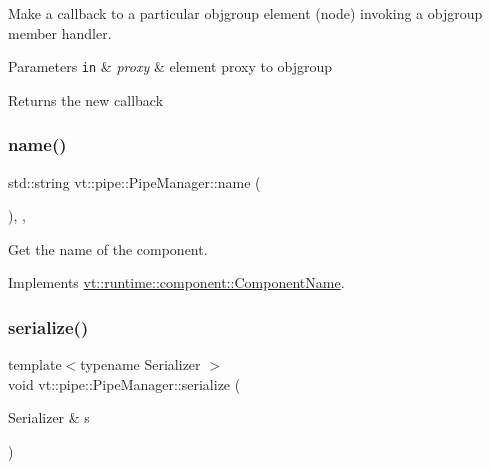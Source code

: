 Make a callback to a particular objgroup element (node) invoking a objgroup member handler. 


\begin{DoxyParams}[1]{Parameters}
\mbox{\tt in}  & {\em proxy} & element proxy to objgroup\\
\hline
\end{DoxyParams}
\begin{DoxyReturn}{Returns}
the new callback 
\end{DoxyReturn}
\mbox{\label{structvt_1_1pipe_1_1_pipe_manager_aad60c922d604dd1b9ff47e428d265eed}} 
\subsubsection{\texorpdfstring{name()}{name()}}
{\footnotesize\ttfamily std\+::string vt\+::pipe\+::\+Pipe\+Manager\+::name (\begin{DoxyParamCaption}{ }\end{DoxyParamCaption})\hspace{0.3cm}{\ttfamily [inline]}, {\ttfamily [override]}, {\ttfamily [virtual]}}



Get the name of the component. 



Implements \hyperlink{structvt_1_1runtime_1_1component_1_1_component_name_a33c06229bb605a2b2ceff68830d6d773}{vt\+::runtime\+::component\+::\+Component\+Name}.

\mbox{\label{structvt_1_1pipe_1_1_pipe_manager_ae7b6be748d81eeeddb0cf84133bb8a7c}} 
\subsubsection{\texorpdfstring{serialize()}{serialize()}}
{\footnotesize\ttfamily template$<$typename Serializer $>$ \\
void vt\+::pipe\+::\+Pipe\+Manager\+::serialize (\begin{DoxyParamCaption}\item[{Serializer \&}]{s }\end{DoxyParamCaption})\hspace{0.3cm}{\ttfamily [inline]}}

